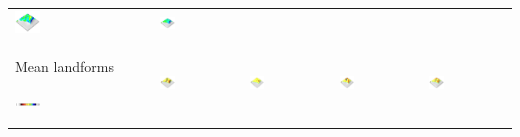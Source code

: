 \documentclass[prodmode,acmtochi]{acmsmall} %
\begin{document}
\begin{table}
{\begin{tabular}{m{} m{} m{} m{} m{}}
\includegraphics[width=0.19\textwidth]{images/render_3d/mean_slope_2.png} &
\includegraphics[width=0.19\textwidth]{images/render_3d/mean_slope_3.png}\\
%
Mean landforms \par \vspace{0.5em} \includegraphics[width=0.19\textwidth]{images/legends/forms_legend.pdf} & 
\includegraphics[width=0.19\textwidth]{images/render_3d/forms_1.png} &
\includegraphics[width=0.19\textwidth]{images/render_3d/mean_forms_1.png} &
\includegraphics[width=0.19\textwidth]{images/render_3d/mean_forms_2.png} &
\includegraphics[width=0.19\textwidth]{images/render_3d/mean_forms_3.png}\\
%
\bottomrule
\end{tabular}}
\label{table:coupling_experiment} 
\end{table}
\end{document}

